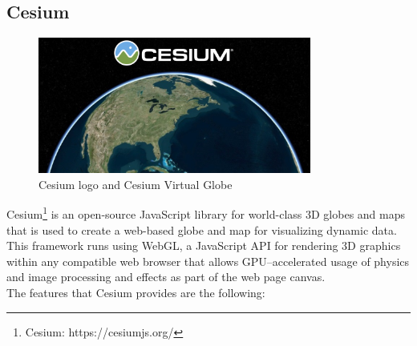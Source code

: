 \subsection{Cesium}
\begin{figure} [H]
\centering
\includegraphics[width=0.8\textwidth]{chapter2/images/cesium_logo}
\caption{Cesium logo and Cesium Virtual Globe}
\label{fig:cesium_logo}
\end{figure}
Cesium\footnote{Cesium: https://cesiumjs.org/} is an open-source JavaScript library for world-class 3D globes and maps that is used to create a web-based globe and map for visualizing dynamic data. This framework runs using WebGL, a JavaScript API for rendering 3D graphics within any compatible web browser that allows GPU--accelerated usage of physics and image processing and effects as part of the web page canvas.\\ 
The features that Cesium provides are the following:
